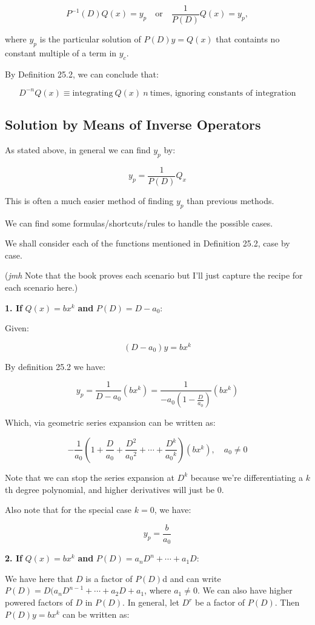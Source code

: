 \documentclass{article}
\begin{document}
\[ \tag{25.21} P^{-1}(D)Q(x) = y_p \quad \text{or} \quad \frac{1}{P(D)}Q(x) = y_p, \]

where $y_p$ is the particular solution of $P(D)y = Q(x)$ that containts no constant multiple of a term in $y_c$.

By Definition 25.2, we can conclude that:

\[ \tag{25.25} D^{-n}Q(x) \equiv \text{integrating}~Q(x)~n~\text{times, ignoring constants of integration} \] 

\subsection{Solution by Means of Inverse Operators}

As stated above, in general we can find $y_p$ by:

\[ y_p = \frac{1}{P(D)}Q_x \]

This is often a much easier method of finding $y_p$ than previous methods.

We can find some formulas/shortcuts/rules to handle the possible cases.

We shall consider each of the functions mentioned in Definition 25.2, case by case.

(\emph{jmh} Note that the book proves each scenario but I'll just capture the recipe for each scenario here.)

\textbf{1. If} $Q(x) = bx^k$ \textbf{and} $P(D) = D - a_0$:

Given:

\[ \tag{a} (D - a_0)y = bx^k \]

By definition 25.2 we have:

\[ \tag{b} y_p = \frac{1}{D - a_0}(bx^k) = \frac{1}{-a_0(1-\frac{D}{a_0})}(bx^k) \]

Which, via geometric series expansion can be written as:

\[ \tag{c} -\frac{1}{a_0}(1 + \frac{D}{a_0} + \frac{D^2}{ {a_0}^2 } + \cdots + \frac{D^k}{ {a_0}^k })(bx^k), \quad a_0 \neq 0 \]

Note that we can stop the series expansion at $D^k$ because we're differentiating a $k$th degree polynomial, and higher derivatives will just be $0$.

Also note that for the special case $k = 0$, we have:

\[ \tag{d} y_p = \frac{b}{a_0} \]

\textbf{2. If} $Q(x) = bx^k$ \textbf{and} $P(D) = a_n D^n + \cdots + a_1 D$:

We have here that $D$ is a factor of $P(D)$d and can write $P(D) = D(a_n D^{n-1} + \cdots + a_2 D + a_1$, where $a_1 \neq 0$. We can also have higher powered factors of $D$ in $P(D)$. In general, let $D^r$ be a factor of $P(D)$. Then $P(D)y = bx^k$ can be written as:
\end{document}
